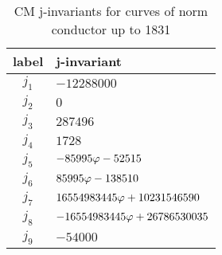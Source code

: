 \documentclass{amsart}
\begin{document}
\begin{center}
\begin{table}[h]
\caption{CM j-invariants for curves of norm conductor up to 1831\label{table:CM-j-invariants}}
\begin{tabular}{|c|l|}\hline
{\bf label} &{\bf j-invariant} \\\hline
$j_1$ & $-12288000$ \\\hline
$j_2$ & $0$ \\\hline
$j_3$ & $ 287496$ \\\hline
$j_4$ & $1728$ \\\hline
$j_5$ & $-85995\varphi - 52515$ \\\hline
$j_6$ & $85995\varphi - 138510$ \\\hline
$j_7$ & $16554983445\varphi + 10231546590$ \\\hline
$j_8$ & $-16554983445\varphi + 26786530035$ \\\hline
$j_9$ & $-54000$ \\\hline
\end{tabular}
\end{table}
\end{center}
\end{document}
